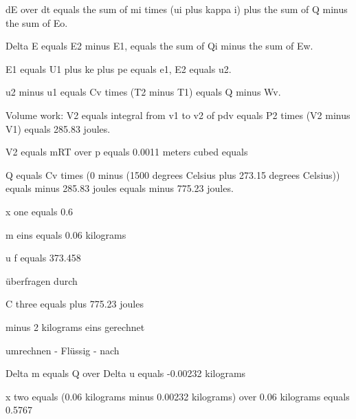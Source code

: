 dE over dt equals the sum of mi times (ui plus kappa i) plus the sum of Q minus the sum of Eo.

Delta E equals E2 minus E1, equals the sum of Qi minus the sum of Ew.

E1 equals U1 plus ke plus pe equals e1, E2 equals u2.

u2 minus u1 equals Cv times (T2 minus T1) equals Q minus Wv.

Volume work:
V2 equals integral from v1 to v2 of pdv equals P2 times (V2 minus V1) equals 285.83 joules.

V2 equals mRT over p equals 0.0011 meters cubed equals

Q equals Cv times (0 minus (1500 degrees Celsius plus 273.15 degrees Celsius)) equals minus 285.83 joules equals minus 775.23 joules.

x one equals 0.6

m eins equals 0.06 kilograms

u f equals 373.458

überfragen durch

C three equals plus 775.23 joules

minus 2 kilograms eins gerechnet

umrechnen - Flüssig - nach

Delta m equals Q over Delta u equals -0.00232 kilograms

x two equals (0.06 kilograms minus 0.00232 kilograms) over 0.06 kilograms equals 0.5767